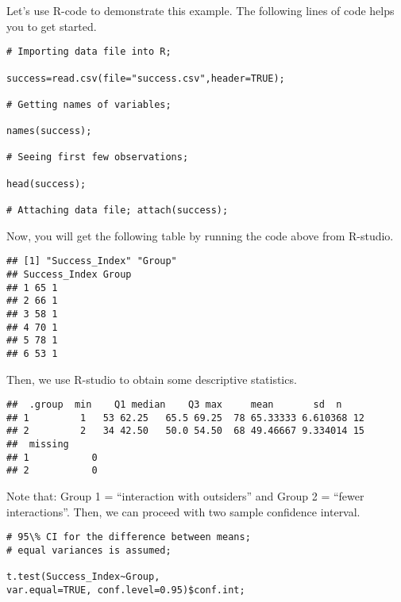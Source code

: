 Let's use R-code to demonstrate this example. The following lines of code helps you to get started.

\begin{tcolorbox}[colback=gray!10, colframe=gray!50, arc=2mm]
\begin{verbatim}
# Importing data file into R;

success=read.csv(file="success.csv",header=TRUE);

# Getting names of variables;

names(success);

# Seeing first few observations;

head(success);

# Attaching data file; attach(success);
\end{verbatim}
\end{tcolorbox}

Now, you will get the following table by running the code above from R-studio.

\begin{tcolorbox}[colback=gray!10, colframe=gray!50, arc=2mm]
\begin{verbatim}
## [1] "Success_Index" "Group" 
## Success_Index Group 
## 1 65 1 
## 2 66 1 
## 3 58 1 
## 4 70 1 
## 5 78 1 
## 6 53 1
\end{verbatim}
\end{tcolorbox}

Then, we use R-studio to obtain some descriptive statistics.

\begin{tcolorbox}[colback=gray!10, colframe=gray!50, arc=2mm]
\begin{verbatim}
##	.group  min    Q1 median    Q3 max     mean       sd  n
## 1 		 1   53 62.25   65.5 69.25  78 65.33333 6.610368 12
## 2 		 2   34 42.50   50.0 54.50  68 49.46667 9.334014 15
## 	missing
## 1 		   0
## 2 		   0
\end{verbatim}
\end{tcolorbox}

Note that: Group 1 = “interaction with outsiders” and Group 2 = “fewer interactions”. Then, we can proceed with two sample confidence interval.

\begin{tcolorbox}[colback=gray!10, colframe=gray!50, arc=2mm]
\begin{verbatim}
# 95\% CI for the difference between means; 
# equal variances is assumed;

t.test(Success_Index~Group, 
var.equal=TRUE, conf.level=0.95)$conf.int;
\end{verbatim}
\end{tcolorbox}

